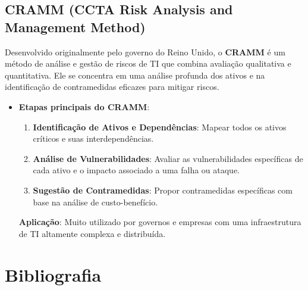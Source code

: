 \documentclass[12pt,oneside,a4paper,article]{abntex2}
\begin{document}
\subsection{CRAMM (CCTA Risk Analysis and Management Method)}

Desenvolvido originalmente pelo governo do Reino Unido, o \textbf{CRAMM} é um método de análise e gestão de riscos de TI que combina avaliação qualitativa e quantitativa. Ele se concentra em uma análise profunda dos ativos e na identificação de contramedidas eficazes para mitigar riscos.

\begin{itemize}
    \item \textbf{Etapas principais do CRAMM}:
    \begin{enumerate}
        \item \textbf{Identificação de Ativos e Dependências}: Mapear todos os ativos críticos e suas interdependências.
        \item \textbf{Análise de Vulnerabilidades}: Avaliar as vulnerabilidades específicas de cada ativo e o impacto associado a uma falha ou ataque.
        \item \textbf{Sugestão de Contramedidas}: Propor contramedidas específicas com base na análise de custo-benefício.
    \end{enumerate}
    \textbf{Aplicação}: Muito utilizado por governos e empresas com uma infraestrutura de TI altamente complexa e distribuída.
\end{itemize}


\newpage

\section*{Bibliografia}
    
\end{document}
